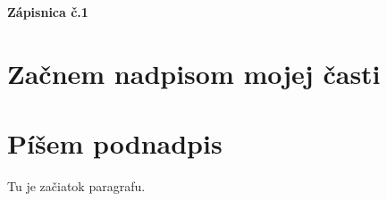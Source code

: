 


	\textbf{{\Huge Zápisnica č.1}}
	
    \section*{Začnem nadpisom mojej časti}
    \section{Píšem podnadpis}
    Tu je začiatok paragrafu.


